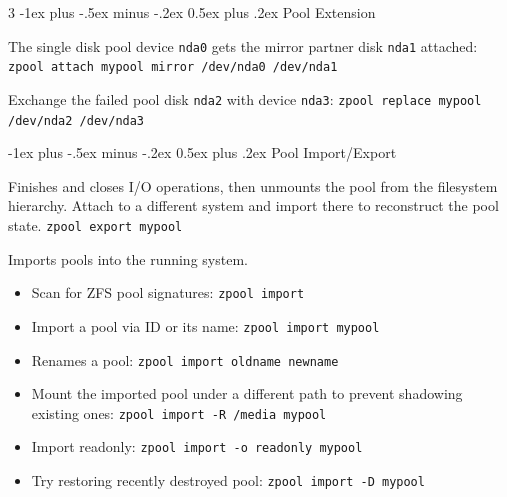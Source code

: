\documentclass[10pt,landscape,letter]{article}
\makeatletter
\renewcommand{\section}{\@startsection{section}{1}{0mm}%
                                {-1ex plus -.5ex minus -.2ex}%
                                {0.5ex plus .2ex}%
                                {\normalfont\large\bfseries}}
\makeatother
\begin{document}
\begin{multicols}{3}
  \section{Pool Extension}
	\begin{Description}
    \item[Turn single disk pool into RAID1] The single disk pool device
      \texttt{nda0} gets the mirror partner disk \texttt{nda1} attached:
      \texttt{zpool attach mypool mirror /dev/nda0 /dev/nda1}
    \item[Replace failed disk] Exchange the failed pool disk \texttt{nda2} with
  device \texttt{nda3}: \texttt{zpool replace mypool /dev/nda2 /dev/nda3}
  \end{Description}

  \section{Pool Import/Export}
	\begin{Description}
    \item[Export] Finishes and closes I/O operations, then unmounts the pool
      from the filesystem hierarchy. Attach to a different system and import
      there to reconstruct the pool state. \texttt{zpool export mypool}

    \item[Import] Imports pools into the running system.
      \begin{itemize}
        \item Scan for ZFS pool signatures: \texttt{zpool import}
        \item Import a pool via ID or its name: \texttt{zpool import mypool}
        \item Renames a pool: \texttt{zpool import oldname newname}
        \item Mount the imported pool under a different path to prevent
          shadowing existing ones: \texttt{zpool import -R /media mypool}
        \item Import readonly: \texttt{zpool import -o readonly mypool}
        \item Try restoring recently destroyed pool: \texttt{zpool import -D mypool}
      \end{itemize}
	\end{Description}


\end{multicols}
\end{document}
